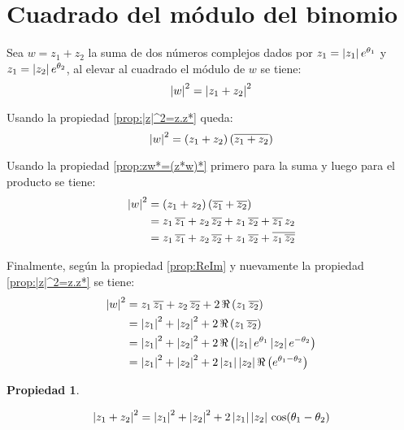 \documentclass[a5paper,12pt,twoside]{book}
\newtheorem{prop}{{Propiedad}}[chapter]
\begin{document}
\section{Cuadrado del módulo del binomio}

Sea $w=z_1+z_2$ la suma de dos números complejos dados por $z_1={\left| {z_1} \right|} \, e^{\theta_1}$ y $z_1={\left| {z_2} \right|} \, e^{\theta_2}$, al elevar al cuadrado el módulo de $w$ se tiene:
\begin{equation*}
    {\left| {w} \right|}^2 = {\left| {z_1+z_2} \right|}^2
\end{equation*}

Usando la propiedad \ref{prop:|z|^2=z.z*} queda:
\begin{equation*}
    {\left| {w} \right|}^2 = \left(z_1+z_2\right) \left( \overline{z_1+z_2} \right)
\end{equation*}

Usando la propiedad \ref{prop:zw*=(z*w)*} primero para la suma y luego para el producto se tiene:
\begin{align*}
    {\left| {w} \right|}^2 &= \left(z_1+z_2\right) \left(\overline{z_1}+\overline{z_2}\right)
    \\
    &= z_1 \, \overline{z_1} + z_2 \, \overline{z_2} + z_1 \, \overline{z_2} + \overline{z_1} \, z_2
    \\
    &= z_1 \, \overline{z_1} + z_2 \, \overline{z_2} + z_1 \, \overline{z_2} + \overline{z_1 \, \overline{z_2}}
\end{align*}

Finalmente, según la propiedad \ref{prop:ReIm} y nuevamente la propiedad \ref{prop:|z|^2=z.z*} se tiene:
\begin{align*}
    {\left| {w} \right|}^2 &= z_1 \, \overline{z_1} + z_2 \, \overline{z_2} + 2 \, \Re \left( z_1 \, \overline{z_2} \right)
    \\
    &= {\left| {z_1} \right|}^2 + {\left| {z_2} \right|}^2 + 2 \, \Re \left( z_1 \, \overline{z_2} \right)
    \\
    &= {\left| {z_1} \right|}^2 + {\left| {z_2} \right|}^2 + 2 \, \Re \left( {\left| {z_1} \right|} \, e^{\theta_1} \, {\left| {z_2} \right|} \, e^{-\theta_2} \right)
    \\
    &= {\left| {z_1} \right|}^2 + {\left| {z_2} \right|}^2 + 2 \, {\left| {z_1} \right|} \, {\left| {z_2} \right|} \, \Re \left( e^{\theta_1-\theta_2} \right)
\end{align*}

\begin{mdframed}[style=MyFrame1]
    \begin{prop}
    \end{prop}
    \begin{equation*}
        {\left| {z_1 + z_2} \right|}^2 = {\left| {z_1} \right|}^2 + {\left| {z_2} \right|}^2 + 2 \, {\left| {z_1} \right|} \, {\left| {z_2} \right|} \, \cos (\theta_1-\theta_2)
    \end{equation*}
\end{mdframed}
\end{document}
